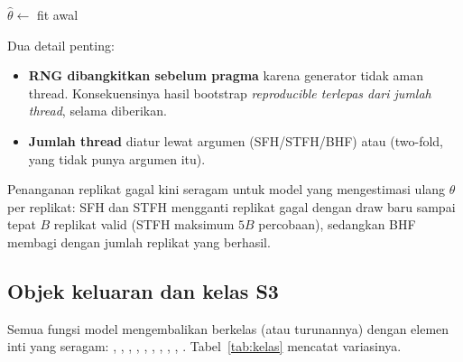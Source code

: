 \begin{algorithm}[htbp]
\caption{Kerangka bootstrap parametrik paralel (sesuai \texttt{eblup\_sfh\_pbmse.cpp}).}
\label{alg:bootstrap}
$\hat\theta\leftarrow$ fit awal\;
\caption*{Akumulasi: $\widehat{\mathrm{MSE}}=B^{-1}\sum_b(\hat\theta_b^\ast-\theta_b^\ast)^2$;
versi bias-koreksi pada teks SFH.}
\end{algorithm}

Dua detail penting:

\begin{itemize}
  \item \textbf{RNG dibangkitkan sebelum pragma} karena generator  tidak
        aman thread. Konsekuensinya hasil bootstrap \emph{reproducible
        terlepas dari jumlah thread}, selama  diberikan.
  \item \textbf{Jumlah thread} diatur lewat argumen 
        (SFH/STFH/BHF) atau  (two-fold, yang tidak
        punya argumen itu).
\end{itemize}

Penanganan replikat gagal kini seragam untuk model yang mengestimasi ulang
$\theta$ per replikat: SFH dan STFH mengganti replikat gagal dengan draw baru
sampai tepat $B$ replikat valid (STFH maksimum $5B$ percobaan), sedangkan BHF
membagi dengan jumlah replikat yang berhasil.

\subsection{Objek keluaran dan kelas S3}\label{sec:kelas}

Semua fungsi model mengembalikan  berkelas  (atau
turunannya) dengan elemen inti yang seragam: , ,
, , ,
, , , , .
Tabel~\ref{tab:kelas} mencatat variasinya.

